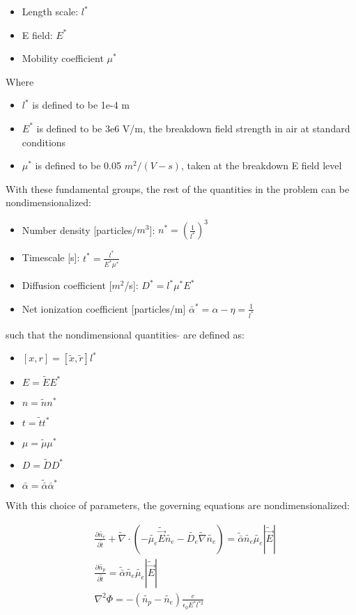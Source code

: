 \documentclass[11pt]{article}
\begin{document}
\begin{itemize}
    \item Length scale: $l^*$
    \item E field: $E^*$
    \item Mobility coefficient $\mu^*$
\end{itemize}

Where
\begin{itemize}
    \item $l^*$ is defined to be 1e-4 m
    \item $E^*$ is defined to be 3e6 V/m, the breakdown field strength in air at standard conditions
    \item $\mu^*$ is defined to be 0.05 $m^2/(V-s)$, taken at the breakdown E field level
\end{itemize}

With these fundamental groups, the rest of the quantities in the problem can be nondimensionalized:

\begin{itemize}
    \item Number density [particles/$m^3$]: $n^* = \left( \frac{1}{l^*} \right)^3$
    \item Timescale [s]: $t^* = \frac{l^*}{E^*\mu^*}$
    \item Diffusion coefficient [$m^2$/s]: $D^* = l^*\mu^*E^*$
    \item Net ionization coefficient [particles/m] $\bar{\alpha}^* = \alpha- \eta= \frac{1}{l^*}$
\end{itemize}

such that the nondimensional quantities $\tilde{}$ are defined as:

\begin{itemize}
    \item $[x,r] = [\tilde{x},\tilde{r}]l^*$
    \item $E = \tilde{E}E^*$
    \item $n=\tilde{n}n^*$
    \item $t = \tilde{t}t^*$
    \item $\mu = \tilde{\mu}\mu^*$
    \item $D=\tilde{D}D^*$
    \item $\bar{\alpha} = \tilde{\bar{\alpha}} \bar{\alpha}^*$
\end{itemize}

With this choice of parameters, the governing equations are nondimensionalized:

\begin{align}
    &\frac{\partial \tilde{n_e}}{\partial \tilde{t}} + \tilde{\nabla} \cdot (-\tilde{\mu_e}\tilde{\vec{E}}\tilde{n_e} - \tilde{D_e}\tilde{\nabla} \tilde{n_e}) = \tilde{\bar{\alpha}}\tilde{n_e}\tilde{\mu_e}|\tilde{\vec{E}}|\\
    &\frac{\partial \tilde{n_p}}{\partial \tilde{t}} = \tilde{\bar{\alpha}}\tilde{n_e}\tilde{\mu_e}|\tilde{\vec{E}}|\\
    &\nabla^2\Phi = -\left( \tilde{n_p}-\tilde{n_e} \right) \frac{e}{\epsilon_0 E^* l^{*2}}
\end{align}
\end{document}
